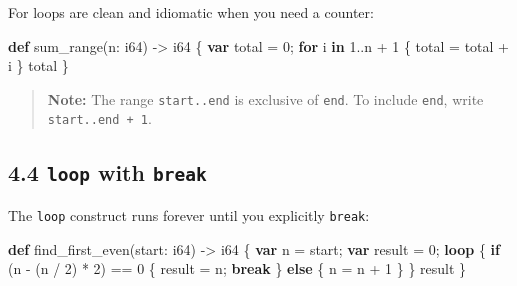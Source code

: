 \documentclass[
  english,
]{book}
\newenvironment{Shaded}{\begin{snugshade}}{\end{snugshade}}
\newcommand{\ControlFlowTok}[1]{\textcolor[rgb]{0.77,0.53,0.75}{\textbf{#1}}}
\newcommand{\DataTypeTok}[1]{\textcolor[rgb]{0.31,0.79,0.69}{#1}}
\newcommand{\DecValTok}[1]{\textcolor[rgb]{0.71,0.81,0.66}{#1}}
\newcommand{\KeywordTok}[1]{\textcolor[rgb]{0.34,0.61,0.84}{\textbf{#1}}}
\newcommand{\NormalTok}[1]{\textcolor[rgb]{0.83,0.83,0.83}{#1}}
\newcommand{\OperatorTok}[1]{\textcolor[rgb]{0.83,0.83,0.83}{#1}}
\begin{document}
For loops are clean and idiomatic when you need a counter:

\begin{Shaded}
\begin{Highlighting}[]
\KeywordTok{def}\NormalTok{ sum\_range(n: }\DataTypeTok{i64}\NormalTok{) }\OperatorTok{{-}\textgreater{}} \DataTypeTok{i64}\NormalTok{ \{}
    \KeywordTok{var}\NormalTok{ total }\OperatorTok{=} \DecValTok{0}\NormalTok{;}
    \ControlFlowTok{for}\NormalTok{ i }\ControlFlowTok{in} \DecValTok{1}\OperatorTok{..}\NormalTok{n }\OperatorTok{+} \DecValTok{1}\NormalTok{ \{}
\NormalTok{        total }\OperatorTok{=}\NormalTok{ total }\OperatorTok{+}\NormalTok{ i}
\NormalTok{    \}}
\NormalTok{    total}
\NormalTok{\}}
\end{Highlighting}
\end{Shaded}

\begin{quote}
\textbf{Note:} The range \texttt{start..end} is exclusive of
\texttt{end}. To include \texttt{end}, write \texttt{start..end\ +\ 1}.
\end{quote}

\subsection{\texorpdfstring{4.4 \texttt{loop} with
\texttt{break}}{4.4 loop with break}}\label{loop-with-break}

The \texttt{loop} construct runs forever until you explicitly
\texttt{break}:

\begin{Shaded}
\begin{Highlighting}[]
\KeywordTok{def}\NormalTok{ find\_first\_even(start: }\DataTypeTok{i64}\NormalTok{) }\OperatorTok{{-}\textgreater{}} \DataTypeTok{i64}\NormalTok{ \{}
    \KeywordTok{var}\NormalTok{ n }\OperatorTok{=}\NormalTok{ start;}
    \KeywordTok{var} \DataTypeTok{result} \OperatorTok{=} \DecValTok{0}\NormalTok{;}
    \ControlFlowTok{loop}\NormalTok{ \{}
        \ControlFlowTok{if}\NormalTok{ (n }\OperatorTok{{-}}\NormalTok{ (n }\OperatorTok{/} \DecValTok{2}\NormalTok{) }\OperatorTok{*} \DecValTok{2}\NormalTok{) }\OperatorTok{==} \DecValTok{0}\NormalTok{ \{}
            \DataTypeTok{result} \OperatorTok{=}\NormalTok{ n;}
            \ControlFlowTok{break}
\NormalTok{        \} }\ControlFlowTok{else}\NormalTok{ \{}
\NormalTok{            n }\OperatorTok{=}\NormalTok{ n }\OperatorTok{+} \DecValTok{1}
\NormalTok{        \}}
\NormalTok{    \}}
    \DataTypeTok{result}
\NormalTok{\}}
\end{Highlighting}
\end{Shaded}
\end{document}
